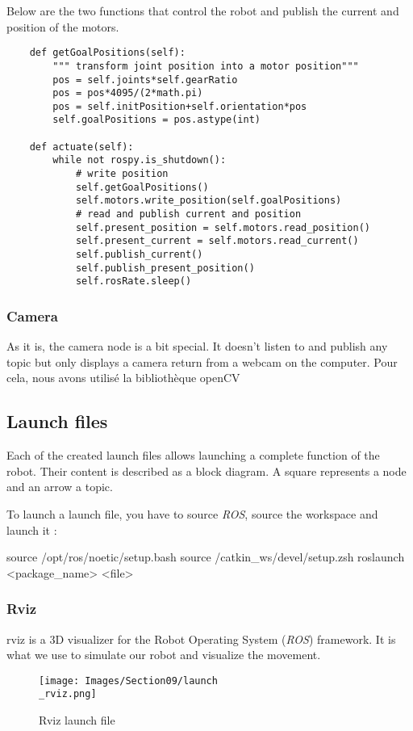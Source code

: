 \bigbreak
Below are the two functions that control the robot and publish the current and position of the motors.
\begin{verbatim}
    def getGoalPositions(self):
        """ transform joint position into a motor position"""
        pos = self.joints*self.gearRatio
        pos = pos*4095/(2*math.pi)
        pos = self.initPosition+self.orientation*pos
        self.goalPositions = pos.astype(int)
        
    def actuate(self):
        while not rospy.is_shutdown():
            # write position
            self.getGoalPositions()
            self.motors.write_position(self.goalPositions)
            # read and publish current and position
            self.present_position = self.motors.read_position()
            self.present_current = self.motors.read_current()
            self.publish_current()
            self.publish_present_position()
            self.rosRate.sleep()
\end{verbatim}

\subsubsection{Camera}
As it is, the camera node is a bit special. It doesn't listen to and publish any topic but only displays a camera return from a webcam on the computer. Pour cela, nous avons utilisé la bibliothèque openCV

\subsection{Launch files}

Each of the created launch files allows launching a complete function of the robot. Their content is described as a block diagram. A square represents a node and an arrow a topic. 

\bigbreak
To launch a launch file, you have to source \textit{ROS}, source the workspace and launch it :
\begin{commandshell}
    source /opt/ros/noetic/setup.bash
    source /catkin_ws/devel/setup.zsh
    roslaunch <package_name> <file>
\end{commandshell} 

\subsubsection{Rviz}

rviz is a 3D visualizer for the Robot Operating System (\textit{ROS}) framework. It is what we use to simulate our robot and visualize the movement.
\bigbreak
\begin{figure}[ht]
    \centering
    \texttt{[image: Images/Section09/launch\\\_rviz.png]}
    \caption{Rviz launch file}
    \label{fig:RvizLaunch}
\end{figure}
\FloatBarrier


